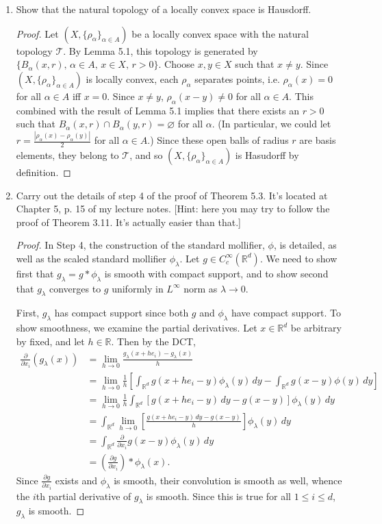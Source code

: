 \documentclass[11pt,oneside,english]{amsart}
\theoremstyle{definition}
\newcommand{\lom}[2]{\lim_{{#1}\rightarrow{#2}}}
\newcommand{\pp}[2]{\frac{\partial{#1}}{\partial{#2}}}
\newcommand{\MC}[1]{\mathcal{#1}}
\newcommand{\MB}[1]{\mathbb{#1}}
\begin{document}
\begin{enumerate}
\item Show that the natural topology of a locally convex space is Hausdorff.

\begin{proof}
Let $(X,\{\rho_\alpha\}_{\alpha\in A})$ be a locally convex space with the natural topology $\MC{T}$. By Lemma 5.1, this topology is generated by $\{B_\alpha(x,r),\,\alpha\in A,\,x\in X,\,r>0\}$. Choose $x,y\in X$ such that $x\neq y$. Since $(X,\{\rho_\alpha\}_{\alpha\in A})$ is locally convex, each $\rho_\alpha$ separates points, i.e. $\rho_\alpha(x)=0$ for all $\alpha\in A$ iff $x=0$. Since $x\neq y$, $\rho_\alpha(x-y)\neq0$ for all $\alpha\in A$. This combined with the result of Lemma 5.1 implies that  there exists an $r>0$ such that $B_\alpha(x,r)\cap B_\alpha(y,r)=\varnothing$ for all $\alpha$. (In particular, we could let $r=\frac{|\rho_\alpha(x)-\rho_\alpha(y)|}{2}$ for all $\alpha\in A$.) Since these open balls of radius $r$ are basis elements, they belong to $\MC{T}$, and so $(X,\{\rho_\alpha\}_{\alpha\in A})$ is Hasudorff by definition.
\end{proof}

\item Carry out the details of step 4 of the proof of Theorem 5.3. It's located at Chapter 5, p. 15 of my lecture notes. [Hint: here you may try to follow the proof of Theorem 3.11. It's actually easier than that.]

\begin{proof}
In Step 4, the construction of the standard mollifier, $\phi$, is detailed, as well as the scaled standard mollifier $\phi_\lambda$. Let $g\in C_c^\infty(\MB{R}^d)$. We need to show first that $g_\lambda=g*\phi_\lambda$ is smooth with compact support, and to show second that $g_\lambda$ converges to $g$ uniformly in $L^\infty$ norm as $\lambda\to0$.

First, $g_\lambda$ has compact support since both $g$ and $\phi_\lambda$ have compact support. To show smoothness, we examine the partial derivatives. Let $x\in \MB{R}^d$ be arbitrary by fixed, and let $h\in \MB{R}$. Then by the DCT,
\begin{align*}
\pp{}{x_i}\left(g_\lambda(x)\right)&=\lom{h}{0}\frac{g_\lambda(x+he_i)-g_\lambda(x)}{h}\\[2mm]
&=\lom{h}{0}\frac{1}{h}\left[\int_{\MB{R}^d} g(x+he_i-y)\phi_\lambda(y)\,dy-\int_{\MB{R}^d} g(x-y)\phi(y)\,dy\right]\\[2mm]
&=\lom{h}{0}\frac{1}{h}\int_{\MB{R}^d} \left[g(x+he_i-y)\,dy-g(x-y)\right]\phi_\lambda(y)\,dy\\[2mm]
&=\int_{\MB{R}^d} \lom{h}{0}\left[\frac{g(x+he_i-y)\,dy-g(x-y)}{h}\right]\phi_\lambda(y)\,dy\\[2mm]
&=\int_{\MB{R}^d} \pp{}{x_i}g(x-y)\phi_\lambda(y)\,dy\\[2mm]
&=\left(\pp{g}{x_i}\right)*\phi_\lambda(x).
\end{align*}
Since $\pp{g}{x_i}$ exists and $\phi_\lambda$ is smooth, their convolution is smooth as well, whence the $i$th partial derivative of $g_\lambda$ is smooth. Since this is true for all $1\leq i\leq d$, $g_\lambda$ is smooth.


\end{proof}
\end{enumerate}
\end{document}
